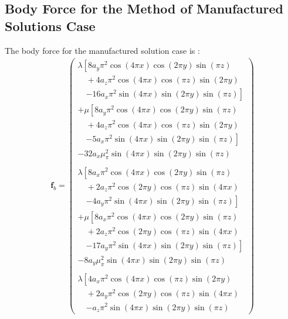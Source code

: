 \documentclass[sn-mathphys,Numbered]{sn-jnl}%
\newcommand{\bb}{\boldsymbol}
\begin{document}
\begin{appendices}
\section{Body Force for the Method of Manufactured Solutions Case} \label{app:mms}
The body force for the manufactured solution case is \citep{Mazzanti2024}:
\begin{align}
\bb{f}_b = 
    \begin{pmatrix}
    \lambda
    \left[
        8 a_y \pi^2 \cos(4\pi x) \cos(2\pi y) \sin(\pi z) \right. \\
        \quad + 4 a_z \pi^2 \cos(4\pi x) \cos(\pi z) \sin(2\pi y) \\
        \quad \left. - 16 a_x \pi^2 \sin(4\pi x) \sin(2\pi y) \sin(\pi z)
    \right] \\
    + \mu
    \left[
        8 a_y \pi^2 \cos(4\pi x) \cos(2\pi y) \sin(\pi z) \right. \\
        \quad + 4 a_z \pi^2 \cos(4\pi x) \cos(\pi z) \sin(2\pi y) \\
        \quad \left. - 5 a_x \pi^2 \sin(4\pi x) \sin(2\pi y) \sin(\pi z)
    \right] \\
    - 32 a_x \mu_ \pi^2 \sin(4\pi x) \sin(2\pi y) \sin(\pi z) \\
    \\
    \lambda
    \left[
        8 a_x \pi^2 \cos(4\pi x) \cos(2\pi y) \sin(\pi z) \right. \\
        \quad + 2 a_z \pi^2 \cos(2\pi y) \cos(\pi z) \sin(4\pi x) \\
        \quad \left. - 4 a_y \pi^2 \sin(4\pi x) \sin(2\pi y) \sin(\pi z)
    \right] \\
    + \mu
    \left[
        8 a_x \pi^2 \cos(4\pi x) \cos(2\pi y) \sin(\pi z) \right. \\
        \quad + 2 a_z \pi^2 \cos(2\pi y) \cos(\pi z) \sin(4\pi x) \\
        \quad \left. - 17 a_y \pi^2 \sin(4\pi x) \sin(2\pi y) \sin(\pi z)
    \right] \\
    - 8 a_y \mu_ \pi^2 \sin(4\pi x) \sin(2\pi y) \sin(\pi z) \\
    \\
    \lambda
    \left[
        4 a_x \pi^2 \cos(4\pi x) \cos(\pi z) \sin(2\pi y) \right. \\
        \quad + 2 a_y \pi^2 \cos(2\pi y) \cos(\pi z) \sin(4\pi x) \\
        \quad \left. - a_z \pi^2 \sin(4\pi x) \sin(2\pi y) \sin(\pi z)

\end{pmatrix}
\end{align}
\end{appendices}
\end{document}

